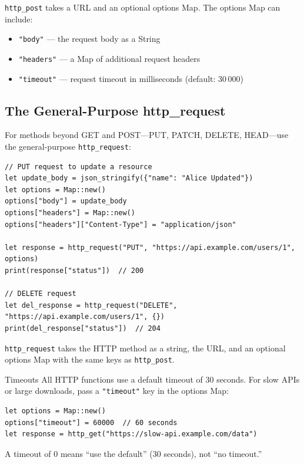 \lstinline|http_post| takes a URL and an optional options Map. The options
Map can include:

\begin{itemize}
    \item \lstinline|"body"| --- the request body as a String
    \item \lstinline|"headers"| --- a Map of additional request headers
    \item \lstinline|"timeout"| --- request timeout in milliseconds (default:
          30\,000)
\end{itemize}

\subsection{The General-Purpose http\_request}\label{sec:http-request}

For methods beyond GET and POST---PUT, PATCH, DELETE, HEAD---use the
general-purpose \lstinline|http_request|:

\begin{lstlisting}[language=Lattice, caption={Using http\_request for other methods}]
// PUT request to update a resource
let update_body = json_stringify({"name": "Alice Updated"})
let options = Map::new()
options["body"] = update_body
options["headers"] = Map::new()
options["headers"]["Content-Type"] = "application/json"

let response = http_request("PUT", "https://api.example.com/users/1", options)
print(response["status"])  // 200

// DELETE request
let del_response = http_request("DELETE", "https://api.example.com/users/1", {})
print(del_response["status"])  // 204
\end{lstlisting}

\lstinline|http_request| takes the HTTP method as a string, the URL, and
an optional options Map with the same keys as \lstinline|http_post|.

\begin{tipbox}{Timeouts}
All HTTP functions use a default timeout of 30 seconds. For slow APIs or
large downloads, pass a \lstinline|"timeout"| key in the options Map:
\begin{lstlisting}[language=Lattice]
let options = Map::new()
options["timeout"] = 60000  // 60 seconds
let response = http_get("https://slow-api.example.com/data")
\end{lstlisting}
A timeout of 0 means ``use the default'' (30 seconds), not ``no timeout.''
\end{tipbox}

